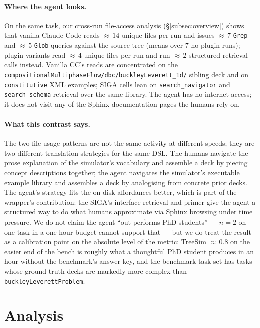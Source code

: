 \documentclass{article}
\begin{document}
\paragraph{Where the agent looks.} On the same task, our cross-run file-access analysis (\S\ref{subsec:overview}) shows that vanilla Claude Code reads ${\approx}\,14$ unique files per run and issues ${\approx}\,7$ \texttt{Grep} and ${\approx}\,5$ \texttt{Glob} queries against the source tree (means over $7$ no-plugin runs); plugin variants read ${\approx}\,4$ unique files per run and run ${\approx}\,2$ structured retrieval calls instead. Vanilla CC's reads are concentrated on the \texttt{compositionalMultiphaseFlow/dbc/buckleyLeverett\_1d/} sibling deck and on \texttt{constitutive} XML examples; SIGA cells lean on \texttt{search\_navigator} and \texttt{search\_schema} retrieval over the same library. The agent has no internet access; it does not visit any of the Sphinx documentation pages the humans rely on.

\paragraph{What this contrast says.} The two file-usage patterns are not the same activity at different speeds; they are two different translation strategies for the same DSL. The humans navigate the prose explanation of the simulator's vocabulary and assemble a deck by piecing concept descriptions together; the agent navigates the simulator's executable example library and assembles a deck by analogising from concrete prior decks. The agent's strategy fits the on-disk affordances better, which is part of the wrapper's contribution: the SIGA's interface retrieval and primer give the agent a structured way to do what humans approximate via Sphinx browsing under time pressure. We do not claim the agent ``out-performs PhD students'' --- $n=2$ on one task in a one-hour budget cannot support that --- but we do treat the result as a calibration point on the absolute level of the metric: TreeSim ${\approx}\,0.8$ on the easier end of the bench is roughly what a thoughtful PhD student produces in an hour without the benchmark's answer key, and the benchmark task set has tasks whose ground-truth decks are markedly more complex than \texttt{buckleyLeverettProblem}.


\section{Analysis}
\label{sec:analysis}
\end{document}
